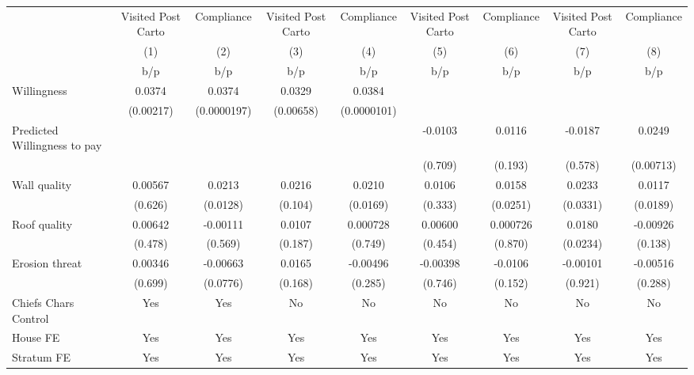 {
\def\sym#1{\ifmmode^{#1}\else\(^{#1}\)\fi}
\begin{tabular}{l*{8}{c}}
\toprule
                &\multicolumn{1}{c}{Visited Post Carto}&\multicolumn{1}{c}{Compliance}&\multicolumn{1}{c}{Visited Post Carto}&\multicolumn{1}{c}{Compliance}&\multicolumn{1}{c}{Visited Post Carto}&\multicolumn{1}{c}{Compliance}&\multicolumn{1}{c}{Visited Post Carto}&\multicolumn{1}{c}{Compliance}\\
                &\multicolumn{1}{c}{(1)}&\multicolumn{1}{c}{(2)}&\multicolumn{1}{c}{(3)}&\multicolumn{1}{c}{(4)}&\multicolumn{1}{c}{(5)}&\multicolumn{1}{c}{(6)}&\multicolumn{1}{c}{(7)}&\multicolumn{1}{c}{(8)}\\
                &      b/p&      b/p&      b/p&      b/p&      b/p&      b/p&      b/p&      b/p\\
\midrule
Willingness     &   0.0374&   0.0374&   0.0329&   0.0384&         &         &         &         \\
                &(0.00217)&(0.0000197)&(0.00658)&(0.0000101)&         &         &         &         \\
Predicted Willingness to pay&         &         &         &         &  -0.0103&   0.0116&  -0.0187&   0.0249\\
                &         &         &         &         &  (0.709)&  (0.193)&  (0.578)&(0.00713)\\
Wall quality    &  0.00567&   0.0213&   0.0216&   0.0210&   0.0106&   0.0158&   0.0233&   0.0117\\
                &  (0.626)& (0.0128)&  (0.104)& (0.0169)&  (0.333)& (0.0251)& (0.0331)& (0.0189)\\
Roof quality    &  0.00642& -0.00111&   0.0107& 0.000728&  0.00600& 0.000726&   0.0180& -0.00926\\
                &  (0.478)&  (0.569)&  (0.187)&  (0.749)&  (0.454)&  (0.870)& (0.0234)&  (0.138)\\
Erosion threat  &  0.00346& -0.00663&   0.0165& -0.00496& -0.00398&  -0.0106& -0.00101& -0.00516\\
                &  (0.699)& (0.0776)&  (0.168)&  (0.285)&  (0.746)&  (0.152)&  (0.921)&  (0.288)\\
Chiefs Chars Control &      Yes&      Yes&       No&       No&       No&       No&       No&       No\\
House FE        &      Yes&      Yes&      Yes&      Yes&      Yes&      Yes&      Yes&      Yes\\
Stratum FE      &      Yes&      Yes&      Yes&      Yes&      Yes&      Yes&      Yes&      Yes\\

\end{tabular}}
